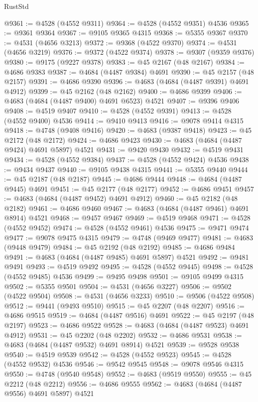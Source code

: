 \begin{lexlean}{RustStd}
\begin{coremodule}
@9361 := @4528 (@4552 @9311)
@9364 := @4528 (@4552 @9351) @4536
@9365 := @9361 @9364
@9367 := @9105 @9365 @4315
@9368 := @5355 @9367
@9370 := @4531 (@4656 @3213)
@9372 := @9368 (@4522 @9370)
@9374 := @4531 (@4656 @3219)
@9376 := @9372 (@4522 @9374)
@9378 := @9307 (@9359 @9376)
@9380 := @9175 (@9227 @9378)
@9383 := @45 @2167 (@48 @2167)
@9384 := @4686 @9383
@9387 := @4684 (@4487 @9384) @4691
@9390 := @45 @2157 (@48 @2157)
@9391 := @4686 @9390
@9396 := @4683 (@4684 (@4487 @9391) @4691 @4912)
@9399 := @45 @2162 (@48 @2162)
@9400 := @4686 @9399
@9406 := @4683 (@4684 (@4487 @9400) @4691 @6523) @4521
@9407 := @9396 @9406
@9408 := @4519 @9407
@9410 := @4528 (@4552 @9391)
@9413 := @4528 (@4552 @9400) @4536
@9414 := @9410 @9413
@9416 := @9078 @9414 @4315
@9418 := @4748 (@9408 @9416)
@9420 := @4683 (@9387 @9418)
@9423 := @45 @2172 (@48 @2172)
@9424 := @4686 @9423
@9430 := @4683 (@4684 (@4487 @9424) @4691 @5897) @4521
@9431 := @9420 @9430
@9432 := @4519 @9431
@9434 := @4528 (@4552 @9384)
@9437 := @4528 (@4552 @9424) @4536
@9438 := @9434 @9437
@9440 := @9105 @9438 @4315
@9441 := @5355 @9440
@9444 := @45 @2187 (@48 @2187)
@9445 := @4686 @9444
@9448 := @4684 (@4487 @9445) @4691
@9451 := @45 @2177 (@48 @2177)
@9452 := @4686 @9451
@9457 := @4683 (@4684 (@4487 @9452) @4691 @4912)
@9460 := @45 @2182 (@48 @2182)
@9461 := @4686 @9460
@9467 := @4683 (@4684 (@4487 @9461) @4691 @8914) @4521
@9468 := @9457 @9467
@9469 := @4519 @9468
@9471 := @4528 (@4552 @9452)
@9474 := @4528 (@4552 @9461) @4536
@9475 := @9471 @9474
@9477 := @9078 @9475 @4315
@9479 := @4748 (@9469 @9477)
@9481 := @4683 (@9448 @9479)
@9484 := @45 @2192 (@48 @2192)
@9485 := @4686 @9484
@9491 := @4683 (@4684 (@4487 @9485) @4691 @5897) @4521
@9492 := @9481 @9491
@9493 := @4519 @9492
@9495 := @4528 (@4552 @9445)
@9498 := @4528 (@4552 @9485) @4536
@9499 := @9495 @9498
@9501 := @9105 @9499 @4315
@9502 := @5355 @9501
@9504 := @4531 (@4656 @3227)
@9506 := @9502 (@4522 @9504)
@9508 := @4531 (@4656 @3233)
@9510 := @9506 (@4522 @9508)
@9512 := @9441 (@9493 @9510)
@9515 := @45 @2207 (@48 @2207)
@9516 := @4686 @9515
@9519 := @4684 (@4487 @9516) @4691
@9522 := @45 @2197 (@48 @2197)
@9523 := @4686 @9522
@9528 := @4683 (@4684 (@4487 @9523) @4691 @4912)
@9531 := @45 @2202 (@48 @2202)
@9532 := @4686 @9531
@9538 := @4683 (@4684 (@4487 @9532) @4691 @8914) @4521
@9539 := @9528 @9538
@9540 := @4519 @9539
@9542 := @4528 (@4552 @9523)
@9545 := @4528 (@4552 @9532) @4536
@9546 := @9542 @9545
@9548 := @9078 @9546 @4315
@9550 := @4748 (@9540 @9548)
@9552 := @4683 (@9519 @9550)
@9555 := @45 @2212 (@48 @2212)
@9556 := @4686 @9555
@9562 := @4683 (@4684 (@4487 @9556) @4691 @5897) @4521

\end{coremodule}
\end{lexlean}
